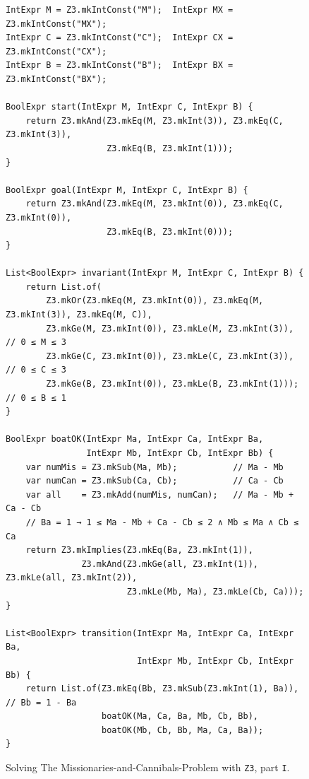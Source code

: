 \begin{figure}[!ht]
\centering
\begin{verbatim}
IntExpr M = Z3.mkIntConst("M");  IntExpr MX = Z3.mkIntConst("MX");
IntExpr C = Z3.mkIntConst("C");  IntExpr CX = Z3.mkIntConst("CX");
IntExpr B = Z3.mkIntConst("B");  IntExpr BX = Z3.mkIntConst("BX");

BoolExpr start(IntExpr M, IntExpr C, IntExpr B) {
    return Z3.mkAnd(Z3.mkEq(M, Z3.mkInt(3)), Z3.mkEq(C, Z3.mkInt(3)),
                    Z3.mkEq(B, Z3.mkInt(1)));
}

BoolExpr goal(IntExpr M, IntExpr C, IntExpr B) {
    return Z3.mkAnd(Z3.mkEq(M, Z3.mkInt(0)), Z3.mkEq(C, Z3.mkInt(0)),
                    Z3.mkEq(B, Z3.mkInt(0)));
}

List<BoolExpr> invariant(IntExpr M, IntExpr C, IntExpr B) {
    return List.of(
        Z3.mkOr(Z3.mkEq(M, Z3.mkInt(0)), Z3.mkEq(M, Z3.mkInt(3)), Z3.mkEq(M, C)),
        Z3.mkGe(M, Z3.mkInt(0)), Z3.mkLe(M, Z3.mkInt(3)),    // 0 ≤ M ≤ 3
        Z3.mkGe(C, Z3.mkInt(0)), Z3.mkLe(C, Z3.mkInt(3)),    // 0 ≤ C ≤ 3
        Z3.mkGe(B, Z3.mkInt(0)), Z3.mkLe(B, Z3.mkInt(1)));   // 0 ≤ B ≤ 1
}

BoolExpr boatOK(IntExpr Ma, IntExpr Ca, IntExpr Ba,
                IntExpr Mb, IntExpr Cb, IntExpr Bb) {
    var numMis = Z3.mkSub(Ma, Mb);           // Ma - Mb
    var numCan = Z3.mkSub(Ca, Cb);           // Ca - Cb
    var all    = Z3.mkAdd(numMis, numCan);   // Ma - Mb + Ca - Cb
    // Ba = 1 → 1 ≤ Ma - Mb + Ca - Cb ≤ 2 ∧ Mb ≤ Ma ∧ Cb ≤ Ca
    return Z3.mkImplies(Z3.mkEq(Ba, Z3.mkInt(1)),
               Z3.mkAnd(Z3.mkGe(all, Z3.mkInt(1)), Z3.mkLe(all, Z3.mkInt(2)),
                        Z3.mkLe(Mb, Ma), Z3.mkLe(Cb, Ca)));
}

List<BoolExpr> transition(IntExpr Ma, IntExpr Ca, IntExpr Ba,
                          IntExpr Mb, IntExpr Cb, IntExpr Bb) {
    return List.of(Z3.mkEq(Bb, Z3.mkSub(Z3.mkInt(1), Ba)),   // Bb = 1 - Ba
                   boatOK(Ma, Ca, Ba, Mb, Cb, Bb),
                   boatOK(Mb, Cb, Bb, Ma, Ca, Ba));
}
\end{verbatim}
\vspace*{-0.3cm}
\caption{Solving The Missionaries-and-Cannibals-Problem with \texttt{Z3}, part \texttt{I}.}
\label{fig:Missionaries-Z3.ipynb-1}
\end{figure}

